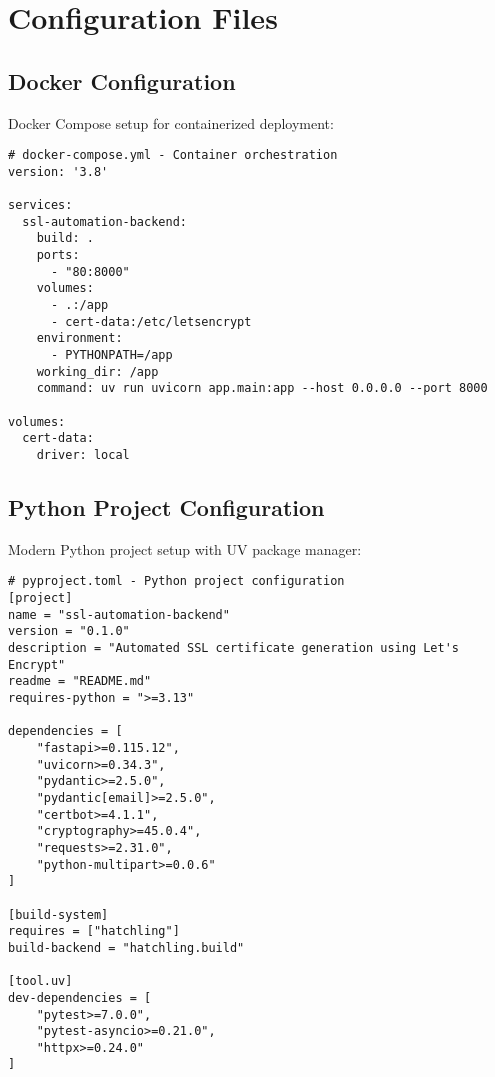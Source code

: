 \section{Configuration Files}

\subsection{Docker Configuration}

Docker Compose setup for containerized deployment:

\begin{verbatim}
# docker-compose.yml - Container orchestration
version: '3.8'

services:
  ssl-automation-backend:
    build: .
    ports:
      - "80:8000"
    volumes:
      - .:/app
      - cert-data:/etc/letsencrypt
    environment:
      - PYTHONPATH=/app
    working_dir: /app
    command: uv run uvicorn app.main:app --host 0.0.0.0 --port 8000

volumes:
  cert-data:
    driver: local
\end{verbatim}

\subsection{Python Project Configuration}

Modern Python project setup with UV package manager:

\begin{verbatim}
# pyproject.toml - Python project configuration
[project]
name = "ssl-automation-backend"
version = "0.1.0"
description = "Automated SSL certificate generation using Let's Encrypt"
readme = "README.md"
requires-python = ">=3.13"

dependencies = [
    "fastapi>=0.115.12",
    "uvicorn>=0.34.3",
    "pydantic>=2.5.0",
    "pydantic[email]>=2.5.0",
    "certbot>=4.1.1",
    "cryptography>=45.0.4",
    "requests>=2.31.0",
    "python-multipart>=0.0.6"
]

[build-system]
requires = ["hatchling"]
build-backend = "hatchling.build"

[tool.uv]
dev-dependencies = [
    "pytest>=7.0.0",
    "pytest-asyncio>=0.21.0",
    "httpx>=0.24.0"
]
\end{verbatim}

